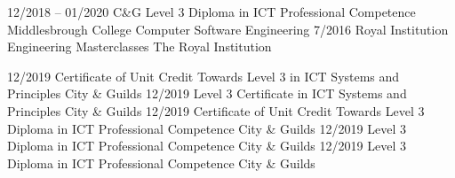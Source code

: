 \documentclass[9pt]{developercv} %
\begin{document}
\vspace{0.5cm}	




\begin{entrylist}
	\entry
		{12/2018 -- 01/2020}
		{C\&G Level 3 Diploma in ICT Professional Competence}
		{Middlesbrough College}
		{Computer Software Engineering}
	\entry
		{7/2016}
		{Royal Institution Engineering Masterclasses}
		{The Royal Institution}
		{}
\end{entrylist}

\begin{entrylist}
	\entry
		{12/2019}
		{Certificate of Unit Credit Towards Level 3 in ICT Systems and Principles}
		{City \& Guilds}
		{}
	\entry
		{12/2019}
		{Level 3 Certificate in ICT Systems and Principles}
		{City \& Guilds}
		{}
	\entry
		{12/2019}
		{Certificate of Unit Credit Towards Level 3 Diploma in ICT Professional Competence}
		{City \& Guilds}
		{}
	\entry
		{12/2019}
		{Level 3 Diploma in ICT Professional Competence}
		{City \& Guilds}
		{}
	\entry
		{12/2019}
		{Level 3 Diploma in ICT Professional Competence}
		{City \& Guilds}
		{}
\end{entrylist}

\vspace{0.5cm}	

\end{document}
